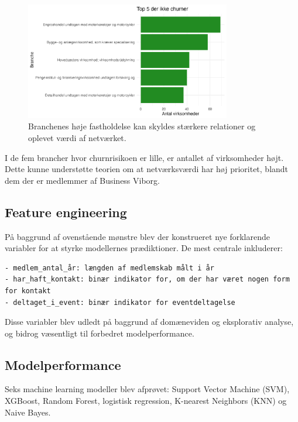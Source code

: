 \documentclass[
  11pt,
  letterpaper,
  DIV=11,
  numbers=noendperiod]{scrartcl}
\begin{document}
\begin{figure}[H]

{\centering \includegraphics[width=0.8\textwidth,height=\textheight]{images/7_top5_der_ikke_churner.png}

}

\caption{Branchenes høje fastholdelse kan skyldes stærkere relationer og
oplevet værdi af netværket.}

\end{figure}%

I de fem brancher hvor churnrisikoen er lille, er antallet af
virksomheder højt. Dette kunne understøtte teorien om at netværksværdi
har høj prioritet, blandt dem der er medlemmer af Business Viborg.

\subsection{Feature engineering}\label{feature-engineering}

På baggrund af ovenstående mønstre blev der konstrueret nye forklarende
variabler for at styrke modellernes prædiktioner. De mest centrale
inkluderer:

\begin{verbatim}
- medlem_antal_år: længden af medlemskab målt i år
- har_haft_kontakt: binær indikator for, om der har været nogen form for kontakt
- deltaget_i_event: binær indikator for eventdeltagelse
\end{verbatim}

Disse variabler blev udledt på baggrund af domæneviden og eksplorativ
analyse, og bidrog væsentligt til forbedret modelperformance.

\subsection{Modelperformance}\label{modelperformance}

Seks machine learning modeller blev afprøvet: Support Vector Machine
(SVM), XGBoost, Random Forest, logistisk regression, K-nearest Neighbors
(KNN) og Naive Bayes.
\end{document}
